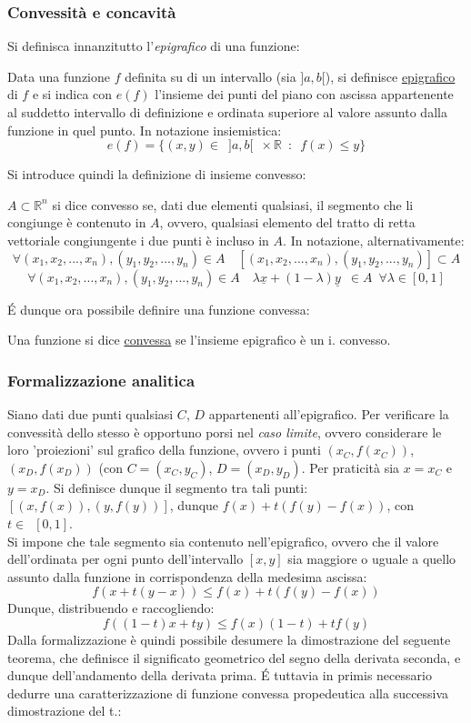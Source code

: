 \documentclass[10pt, oneside]{book}
\theoremstyle{plain}
\begin{document}
\subsubsection{Convessità e concavità}
Si definisca innanzitutto l'\textit{epigrafico} di una funzione:
\begin{defin}
Data una funzione $f$ definita su di un intervallo (sia $]a, b[$), si definisce \underline{epigrafico} di $f$ e si indica con $e(f)$ l'insieme dei punti del piano con ascissa appartenente al suddetto intervallo di definizione e ordinata superiore al valore assunto dalla funzione in quel punto. In notazione insiemistica:
\[e(f) = \{(x,y) \in \enspace ]a, b[ \enspace \times \mathbb{R} \enspace : \enspace f(x) \leq y\}\]
\end{defin}
Si introduce quindi la definizione di insieme convesso:
\begin{defin}
$A \subset \mathbb{R}^n$ si dice convesso se, dati due elementi qualsiasi, il segmento che li congiunge è contenuto in $A$, ovvero, qualsiasi elemento del tratto di retta vettoriale congiungente i due punti è incluso in $A$. In notazione, alternativamente:
\[\forall (x_1, x_2, ..., x_n), (y_1, y_2, ..., y_n) \in A \quad [(x_1, x_2, ..., x_n), (y_1, y_2, ..., y_n)] \subset A\]
\[\forall (x_1, x_2, ..., x_n), (y_1, y_2, ..., y_n) \in A \quad \lambda \underline{x} + (1-\lambda) \underline{y} \enspace \in A \enspace \forall \lambda \in [0,1]\]
\end{defin}
\'E dunque ora possibile definire una funzione convessa:
\begin{defin}
Una funzione si dice \underline{convessa} se l'insieme epigrafico è un i. convesso.
\end{defin}
\subsubsection{Formalizzazione analitica}
Siano dati due punti qualsiasi $C$, $D$ appartenenti all'epigrafico. Per verificare la convessità dello stesso è opportuno porsi nel \textit{caso limite}, ovvero considerare le loro 'proiezioni' sul grafico della funzione, ovvero i punti $(x_C, f(x_C))$, $(x_D, f(x_D))$ (con $C = (x_C, y_C)$, $D = (x_D, y_D)$. Per praticità sia $x = x_C$ e $y = x_D$. Si definisce dunque il segmento tra tali punti: $[(x, f(x)), (y, f(y))]$, dunque $f(x) + t (f(y) - f(x))$, con $t \in \enspace [0, 1]$.\\
Si impone che tale segmento sia contenuto nell'epigrafico, ovvero che il valore dell'ordinata per ogni punto dell'intervallo $[x, y]$ sia maggiore o uguale a quello assunto dalla funzione in corrispondenza della medesima ascissa:
\[f(x + t (y - x)) \leq f(x) + t (f(y) - f(x))\]
Dunque, distribuendo e raccogliendo:
\[f((1-t) x + t y) \leq f(x) (1-t) + t f(y)\]
Dalla formalizzazione è quindi possibile desumere la dimostrazione del seguente teorema, che definisce il significato geometrico del segno della derivata seconda, e dunque dell'andamento della derivata prima. \'E tuttavia in primis necessario dedurre una caratterizzazione di funzione convessa propedeutica alla successiva dimostrazione del t.:
\end{document}
